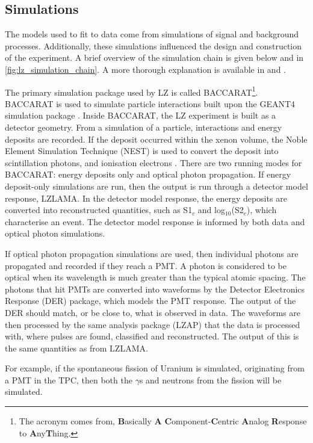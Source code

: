 \subsection{Simulations}
\label{sec:lz_simluations_chain}
\par
The models used to fit to data come from simulations of signal and background processes.
Additionally, these simulations influenced the design and construction of the experiment.
A brief overview of the simulation chain is given below and in \autoref{fig:lz_simulation_chain}.
A more thorough explanation is available in \cite{lz_simulations_ref} and \cite{theresafruth_thesis_ref}.
\par
The primary simulation package used by LZ is called BACCARAT\footnote{The acronym comes from, \textbf{B}asically \textbf{A} \textbf{C}omponent-\textbf{C}entric \textbf{A}nalog \textbf{R}esponse to \textbf{A}ny\textbf{T}hing.}.
BACCARAT is used to simulate particle interactions built upon the GEANT4 simulation package \cite{geant4_geometry_ref}.
Inside BACCARAT, the LZ experiment is built as a detector geometry.
From a simulation of a particle, interactions and energy deposits are recorded.
If the deposit occurred within the xenon volume, the Noble Element Simulation Technique (NEST) is used to convert the deposit into scintillation photons, and ionisation electrons \cite{nest_1_ref}.
There are two running modes for BACCARAT: energy deposits only and optical photon propagation.
If energy deposit-only simulations are run, then the output is run through a detector model response, LZLAMA.
In the detector model response, the energy deposits are converted into reconstructed quantities, such as S1$_c$ and log$_{10}$(S2$_c$), which characterise an event.
The detector model response is informed by both data and optical photon simulations.
\par
If optical photon propagation simulations are used, then individual photons are propagated and recorded if they reach a PMT.
A photon is considered to be optical when its wavelength is much greater than the typical atomic spacing.
The photons that hit PMTs are converted into waveforms by the Detector Electronics Response (DER) package, which models the PMT response.
The output of the DER should match, or be close to, what is observed in data.
The waveforms are then processed by the same analysis package (LZAP) that the data is processed with, where pulses are found, classified and reconstructed.
The output of this is the same quantities as from LZLAMA.
\par
For example, if the spontaneous fission of Uranium is simulated, originating from a PMT in the TPC, then both the $\gamma$s and neutrons from the fission will be simulated.

